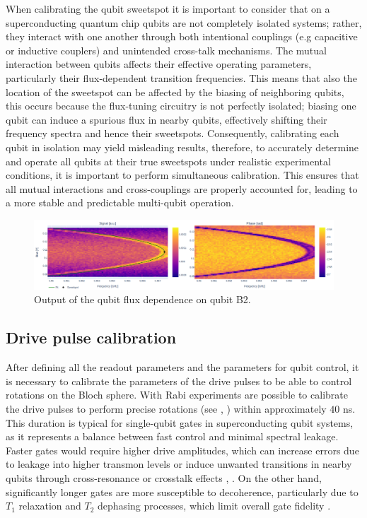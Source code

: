 When calibrating the qubit sweetspot it is important to consider that on a superconducting quantum chip qubits are not completely isolated systems; rather, they interact with one another through both intentional couplings (e.g capacitive or inductive couplers) and unintended cross-talk mechanisms. 
The mutual interaction between qubits affects their effective operating parameters, particularly their flux-dependent transition frequencies.
This means that also the location of the sweetspot can be affected by the biasing of neighboring qubits, this occurs because the flux-tuning circuitry is not perfectly isolated; biasing one qubit can induce a spurious flux in nearby qubits, effectively shifting their frequency spectra and hence their sweetspots.
Consequently, calibrating each qubit in isolation may yield misleading results, therefore, to accurately determine and operate all qubits at their true sweetspots under realistic experimental conditions, it is important to perform simultaneous calibration. 
This ensures that all mutual interactions and cross-couplings are properly accounted for, leading to a more stable and predictable multi-qubit operation.

\begin{figure}[h!]
    \centering
    \includegraphics[width=\textwidth]{figures/png/qubit_flux.png}
    \caption{Output of the qubit flux dependence on qubit B2.}
    \label{fig:qubit_flux}
\end{figure}

\subsection{Drive pulse calibration}\label{sec:Rabi}

After defining all the readout parameters and the parameters for qubit control, it is necessary to calibrate the parameters of the drive pulses to be able to control rotations on the Bloch sphere.
With Rabi experiments are possible to calibrate the drive pulses to perform precise rotations (see \cite{Rabi1936}, \cite{Wallraff2005}) within approximately $40$ ns.
This duration is typical for single-qubit gates in superconducting qubit systems, as it represents a balance between fast control and minimal spectral leakage. 
Faster gates would require higher drive amplitudes, which can increase errors due to leakage into higher transmon levels or induce unwanted transitions in nearby qubits through cross-resonance or crosstalk effects \cite{TransmonPaper}, \cite{Motzoi_2009}. 
On the other hand, significantly longer gates are more susceptible to decoherence, particularly due to $T_1$ relaxation and $T_2$ dephasing processes, which limit overall gate fidelity \cite{Barends2014-pb}.

